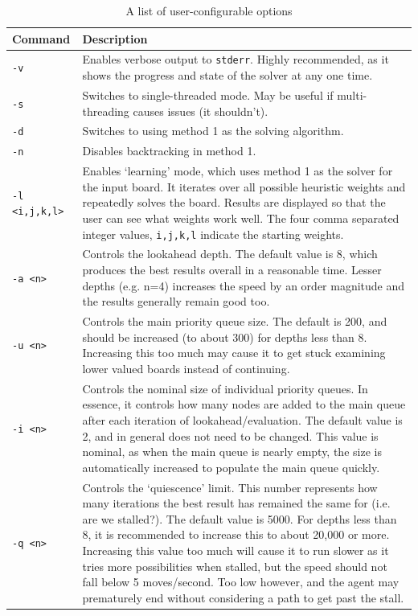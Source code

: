 \documentclass[a4paper, 11pt, titlepage]{report}
\begin{document}
\begin{appendices}
\begin{table}[H]
  \centering
  \caption{A list of user-configurable options}
    \begin{tabularx}{\textwidth}{lX}
    \hline
    Command & Description \\
    \hline
    \texttt{-v} & Enables verbose output to \texttt{stderr}. Highly recommended, as it shows the progress and state of the solver at any one time. \\
    \texttt{-s} & Switches to single-threaded mode. May be useful if multi-threading causes issues (it shouldn't). \\
    \texttt{-d} & Switches to using method 1 as the solving algorithm. \\
    \texttt{-n} & Disables backtracking in method 1. \\
    \texttt{-l <i,j,k,l>} & Enables `learning' mode, which uses method 1 as the solver for the input board. It iterates over all possible heuristic weights and repeatedly solves the board. Results are displayed so that the user can see what weights work well. The four comma separated integer values, \texttt{i,j,k,l} indicate the starting weights. \\
    \texttt{-a <n>} & Controls the lookahead depth. The default value is 8, which produces the best results overall in a reasonable time. Lesser depths (e.g. n=4) increases the speed by an order magnitude and the results generally remain good too.  \\
    \texttt{-u <n>} & Controls the main priority queue size. The default is 200, and should be increased (to about 300) for depths less than 8. Increasing this too much may cause it to get stuck examining lower valued boards instead of continuing. \\
    \texttt{-i <n>} & Controls the nominal size of individual priority queues. In essence, it controls how many nodes are added to the main queue after each iteration of lookahead/evaluation. The default value is 2, and in general does not need to be changed. This value is nominal, as when the main queue is nearly empty, the size is automatically increased to populate the main queue quickly. \\
    \texttt{-q <n>} & Controls the `quiescence' limit. This number represents how many iterations the best result has remained the same for (i.e. are we stalled?). The default value is 5000. For depths less than 8, it is recommended to increase this to about 20,000 or more. Increasing this value too much will cause it to run slower as it tries more possibilities when stalled, but the speed should not fall below 5 moves/second. Too low however, and the agent may prematurely end without considering a path to get past the stall.\\

\end{tabularx}
\end{table}
\end{appendices}
\end{document}
